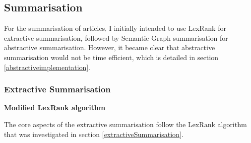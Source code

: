 \documentclass[12pt]{article}
\begin{document}
\subsection{Summarisation}

For the summarisation of articles, I initially intended to use LexRank for extractive summarisation, followed by Semantic Graph summarisation for abstractive summarisation. However, it became clear that abstractive summarisation would not be time efficient, which is detailed in section \ref{abstractiveimplementation}.

\subsubsection{Extractive Summarisation}

\label{extractiveimplementation}

\textbf{Modified LexRank algorithm}

The core aspects of the extractive summarisation follow the LexRank algorithm that was investigated in section \ref{extractiveSummarisation}. 
\end{document}
